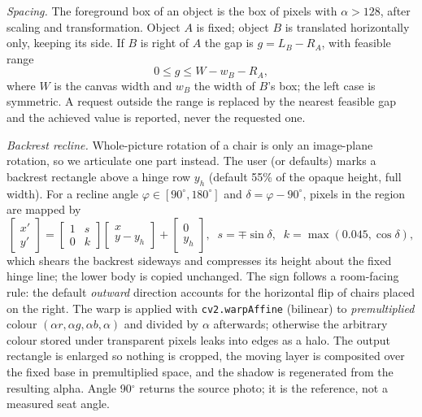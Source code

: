 \documentclass[conference]{IEEEtran}
\begin{document}
\emph{Spacing.} The foreground box of an object is the box of pixels with $\alpha>128$, after scaling and transformation. Object $A$ is fixed; object $B$ is translated horizontally only, keeping its side. If $B$ is right of $A$ the gap is $g=L_B-R_A$, with feasible range
\begin{equation}
0\le g\le W-w_B-R_A ,
\end{equation}
where $W$ is the canvas width and $w_B$ the width of $B$'s box; the left case is symmetric. A request outside the range is replaced by the nearest feasible gap and the achieved value is reported, never the requested one.

\emph{Backrest recline.} Whole-picture rotation of a chair is only an image-plane rotation, so we articulate one part instead. The user (or defaults) marks a backrest rectangle above a hinge row $y_h$ (default 55\% of the opaque height, full width). For a recline angle $\varphi\in[90^\circ,180^\circ]$ and $\delta=\varphi-90^\circ$, pixels in the region are mapped by
\begin{equation}
\begin{bmatrix}x'\\y'\end{bmatrix}=
\begin{bmatrix}1&s\\0&k\end{bmatrix}\!\begin{bmatrix}x\\y-y_h\end{bmatrix}+\begin{bmatrix}0\\y_h\end{bmatrix},\;\;
s=\mp\sin\delta,\;\; k=\max(0.045,\cos\delta),
\end{equation}
which shears the backrest sideways and compresses its height about the fixed hinge line; the lower body is copied unchanged. The sign follows a room-facing rule: the default \emph{outward} direction accounts for the horizontal flip of chairs placed on the right. The warp is applied with \texttt{cv2.warpAffine} (bilinear) to \emph{premultiplied} colour $(\alpha r,\alpha g,\alpha b,\alpha)$ and divided by $\alpha$ afterwards; otherwise the arbitrary colour stored under transparent pixels leaks into edges as a halo. The output rectangle is enlarged so nothing is cropped, the moving layer is composited over the fixed base in premultiplied space, and the shadow is regenerated from the resulting alpha. Angle 90$^\circ$ returns the source photo; it is the reference, not a measured seat angle.
\end{document}
